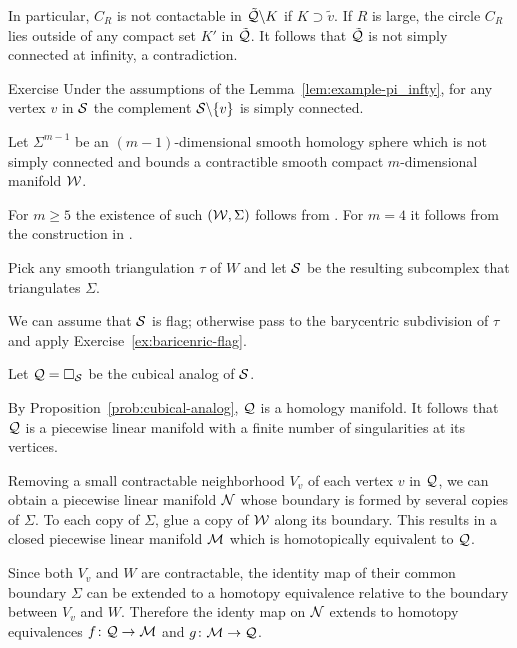 In particular, 
$C_R$ is not contactable in $\tilde{\mathcal{Q}}\backslash K$
if $K\supset \tilde v$.
If $R$ is large, 
the circle $C_R$  
lies outside of any compact set $K'$ in $\tilde{\mathcal{Q}}$.
It follows that $\tilde{\mathcal{Q}}$ is not simply connected at infinity, a contradiction.
\qeds

\begin{thm}{Exercise}\label{ex:example-pi_infty-new}
Under the assumptions of the Lemma~\ref{lem:example-pi_infty}, 
for any vertex $v$ in $\mathcal{S}$
the complement $\mathcal{S}\backslash\{v\}$ is simply connected.
\end{thm}

Let $\Sigma^{m-1}$ be an $(m-1)$-dimensional smooth homology sphere which is not simply connected and bounds a contractible smooth compact $m$-dimensional manifold $\mathcal{W}$. 

For $m\ge 5$ the existence of such $(\mathcal{W}, \Sigma)$ follows from \cite{kervaire}. 
For $m=4$ it follows from the construction in \cite{mazur}.

Pick any smooth triangulation $\tau$ of $W$ and let $\mathcal{S}$ be the resulting subcomplex that triangulates $\Sigma$.


We can assume that $\mathcal{S}$ is flag; 
otherwise pass to the barycentric subdivision 
of $\tau$ and apply Exercise~\ref{ex:baricenric-flag}.


Let $\mathcal{Q}=\square_{\mathcal{S}}$ be the cubical analog of $\mathcal{S}$.

By Proposition~\ref{prob:cubical-analog},
$\mathcal{Q}$ is a homology manifold.
It follows that $\mathcal{Q}$ is a piecewise linear manifold 
with a finite number of singularities at its vertices.


Removing a small contractable neighborhood $V_v$ of each vertex $v$ in $\mathcal{Q}$,
we can obtain a piecewise linear manifold $\mathcal{N}$
whose boundary is formed by several copies of $\Sigma$.
To each copy of $\Sigma$, 
glue a copy of  $\mathcal{W}$ along its boundary.
This results in a  closed piecewise linear manifold 
$\mathcal{M}$ which is homotopically equivalent to $\mathcal{Q}$.

Since both $V_v$ and $W$ are contractable, the identity map of  their common boundary $\Sigma$ can be extended to a homotopy equivalence relative to the boundary between $V_v$ and $W$.
Therefore the identy map on $\mathcal{N}$ extends to homotopy equivalences 
$f\: \spc Q\to \spc M$ and $g\:\spc M\to \spc Q$.


